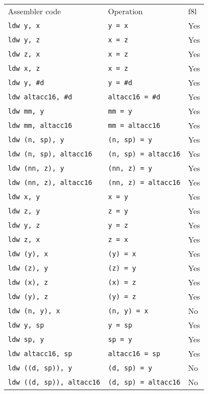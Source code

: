 \documentclass{book}
\begin{document}
\begin{tabular}{l l l}
Assembler code                   & Operation                   & f8l \\
\texttt{ldw y, x}                & \texttt{y = x}              & Yes \\
\texttt{ldw y, z}                & \texttt{x = z}              & Yes \\
\texttt{ldw z, x}                & \texttt{x = z}              & Yes \\
\texttt{ldw x, z}                & \texttt{x = z}              & Yes \\
\texttt{ldw y, \#d}              & \texttt{y = \#d}            & Yes \\
\texttt{ldw altacc16, \#d}       & \texttt{altacc16 = \#d}     & Yes \\
\texttt{ldw mm, y}               & \texttt{mm = y}             & Yes \\
\texttt{ldw mm, altacc16}        & \texttt{mm = altacc16}      & Yes \\
\texttt{ldw (n, sp), y}          & \texttt{(n, sp) = y}        & Yes \\
\texttt{ldw (n, sp), altacc16}   & \texttt{(n, sp) = altacc16} & Yes \\
\texttt{ldw (nn, z), y}          & \texttt{(nn, z) = y}        & Yes \\
\texttt{ldw (nn, z), altacc16}   & \texttt{(nn, z) = altacc16} & Yes \\
\texttt{ldw x, y}                & \texttt{x = y}              & Yes \\
\texttt{ldw z, y}                & \texttt{z = y}              & Yes \\
\texttt{ldw y, z}                & \texttt{y = z}              & Yes \\
\texttt{ldw z, x}                & \texttt{z = x}              & Yes \\
\texttt{ldw (y), x}              & \texttt{(y) = x}            & Yes \\
\texttt{ldw (z), y}              & \texttt{(z) = y}            & Yes \\
\texttt{ldw (x), z}              & \texttt{(x) = z}            & Yes \\
\texttt{ldw (y), z}              & \texttt{(y) = z}            & Yes \\
\texttt{ldw (n, y), x}           & \texttt{(n, y) = x}         & No \\
\texttt{ldw y, sp}               & \texttt{y = sp}             & Yes \\
\texttt{ldw sp, y}               & \texttt{sp = y}             & Yes \\
\texttt{ldw altacc16, sp}        & \texttt{altacc16 = sp}      & Yes \\
\texttt{ldw ((d, sp)), y}        & \texttt{(d, sp) = y}        & No \\
\texttt{ldw ((d, sp)), altacc16} & \texttt{(d, sp) = altacc16} & No \\
\end{tabular}
\end{document}
